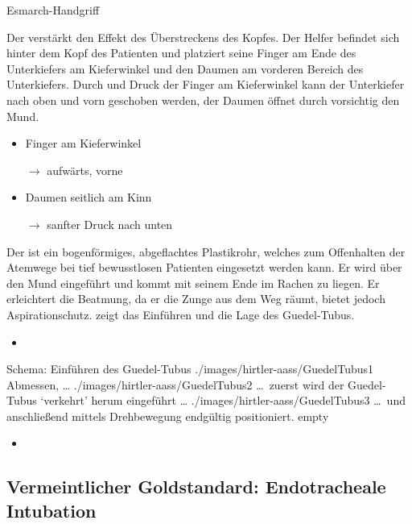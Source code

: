 \TextSlide
{Esmarch-Handgriff}
{Der  verstärkt den Effekt des
Überstreckens des Kopfes. Der Helfer befindet sich hinter
dem Kopf des Patienten und platziert seine Finger
 am Ende des Unterkiefers am Kieferwinkel und
den Daumen am vorderen Bereich des Unterkiefers. Durch 
und  Druck der Finger am
Kieferwinkel kann der Unterkiefer nach oben und vorn
geschoben werden, der Daumen öffnet durch  vorsichtig den Mund. \cite{Erc2010Sec4}

}
{
\begin{itemize}
  \item Finger
 am Kieferwinkel

$\rightarrow$ aufwärts, vorne
\item Daumen seitlich am Kinn

$\rightarrow$  sanfter Druck nach unten
\end{itemize}
}


{%
Der  ist ein bogenförmiges, abgeflachtes
Plastikrohr, welches zum Offenhalten der Atemwege bei tief
bewusstlosen Patienten eingesetzt werden kann. Er wird über
den Mund eingeführt und kommt mit seinem Ende im Rachen zu
liegen. Er erleichtert die Beatmung, da er die Zunge
aus dem Weg räumt, bietet jedoch 
Aspirationschutz. 
zeigt das Einführen und die Lage des Guedel-Tubus.
}
{%
\begin{itemize}
  \item
\end{itemize}
}

\begin{PictureSeriesWide}{}{Schema: Einführen des Guedel-Tubus
\label{fig:guedel-einfuehren-advanced}}
{./images/hirtler-aass/GuedelTubus1}
{Abmessen, \ldots}
{./images/hirtler-aass/GuedelTubus2}
{\ldots\ zuerst wird der Guedel-Tubus \enquote*{verkehrt}
herum eingeführt \ldots}
{./images/hirtler-aass/GuedelTubus3}
{\ldots\ und anschließend mittels Drehbewegung endgültig
positioniert.}
{empty}
{}
\end{PictureSeriesWide}

{%

}
{%
\begin{itemize}
  \item
\end{itemize}
}

\subsection{Vermeintlicher Goldstandard: Endotracheale Intubation}


